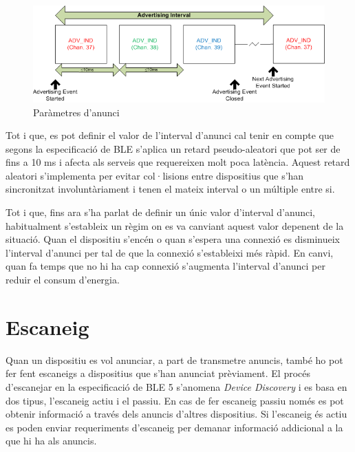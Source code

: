 \begin{figure}[h!]
	\begin{center}
		\includegraphics{./images/advertisement_params.png}
		\caption{Paràmetres d'anunci \cite{advertisment_params}}
		\label{fig:advertisment_params}
	\end{center}
\end{figure}

Tot i que, es pot definir el valor de l'interval d'anunci cal tenir en compte que segons la especificació de BLE s'aplica un retard pseudo-aleatori que pot ser de fins a 10 ms i afecta als serveis que requereixen molt poca latència.
Aquest retard aleatori s'implementa per evitar col·lisions entre dispositius que s'han sincronitzat involuntàriament i tenen el mateix interval o un múltiple entre si.

Tot i que, fins ara s'ha parlat de definir un únic valor d'interval d'anunci, habitualment s'estableix un règim on es va canviant aquest valor depenent de la situació.
Quan el dispositiu s'encén o quan s'espera una connexió es disminueix l'interval d'anunci per tal de que la connexió s'estableixi més ràpid.
En canvi, quan fa temps que no hi ha cap connexió s'augmenta l'interval d'anunci per reduir el consum d'energia. 


\section{Escaneig}
Quan un dispositiu es vol anunciar, a part de transmetre anuncis, també ho pot fer fent escaneigs a dispositius que s'han anunciat prèviament.
El procés d'escanejar en la especificació de BLE 5 s'anomena \textit{Device Discovery} i es basa en dos tipus, l'escaneig actiu i el passiu.
En cas de fer escaneig passiu només es pot obtenir informació a través dels anuncis d'altres dispositius.
Si l'escaneig és actiu es poden enviar requeriments d'escaneig per demanar informació addicional a la que hi ha als anuncis.

